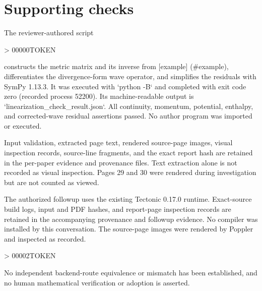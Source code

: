 \documentclass[10pt]{article}
\begin{document}
\section*{Supporting checks}
The reviewer-authored script\par
> 00000TOKEN\par
constructs the metric matrix and its inverse from [example] (\#example), differentiates the divergence-form wave operator, and simplifies the residuals with SymPy 1.13.3. It was executed with `python -B` and completed with exit code zero (recorded process 52200). Its machine-readable output is `linearization\_check\_result.json`. All continuity, momentum, potential, enthalpy, and corrected-wave residual assertions passed. No author program was imported or executed.\par
Input validation, extracted page text, rendered source-page images, visual inspection records, source-line fragments, and the exact report hash are retained in the per-paper evidence and provenance files. Text extraction alone is not recorded as visual inspection. Pages 29 and 30 were rendered during investigation but are not counted as viewed.\par
The authorized followup uses the existing Tectonic 0.17.0 runtime. Exact-source build logs, input and PDF hashes, and report-page inspection records are retained in the accompanying provenance and followup evidence. No compiler was installed by this conversation. The source-page images were rendered by Poppler and inspected as recorded.\par
> 00002TOKEN\par
No independent backend-route equivalence or mismatch has been established, and no human mathematical verification or adoption is asserted.\par
\end{document}
